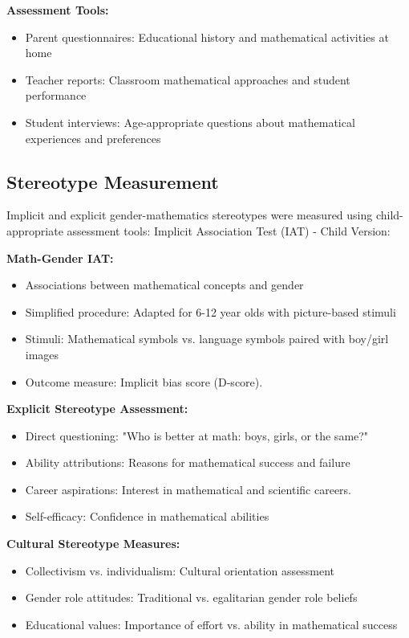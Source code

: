\documentclass[12pt, a4paper]{article}
\begin{document}
\noindent
\textbf{Assessment Tools:}
\begin{itemize}
\item Parent questionnaires: Educational history and mathematical activities at home
\item Teacher reports: Classroom mathematical approaches and student performance
\item Student interviews: Age-appropriate questions about mathematical experiences and preferences
\end{itemize}


\subsection{Stereotype Measurement}
Implicit and explicit gender-mathematics stereotypes were measured using child-appropriate assessment tools:
Implicit Association Test (IAT) - Child Version:

\vspace{0.5\baselineskip}
\noindent
\textbf{Math-Gender IAT: }
\begin{itemize}
\item Associations between mathematical concepts and gender
\item Simplified procedure: Adapted for 6-12 year olds with picture-based stimuli
\item Stimuli: Mathematical symbols vs. language symbols paired with boy/girl images
\item Outcome measure: Implicit bias score (D-score).
\end{itemize}

\noindent
\textbf{Explicit Stereotype Assessment:}
\begin{itemize}
\item Direct questioning: "Who is better at math: boys, girls, or the same?"
\item Ability attributions: Reasons for mathematical success and failure
\item Career aspirations: Interest in mathematical and scientific careers.
\item Self-efficacy: Confidence in mathematical abilities
\end{itemize}

\noindent
\textbf{Cultural Stereotype Measures:}
\begin{itemize}
\item Collectivism vs. individualism: Cultural orientation assessment
\item Gender role attitudes: Traditional vs. egalitarian gender role beliefs
\item Educational values: Importance of effort vs. ability in mathematical success
\end{itemize}
\end{document}
